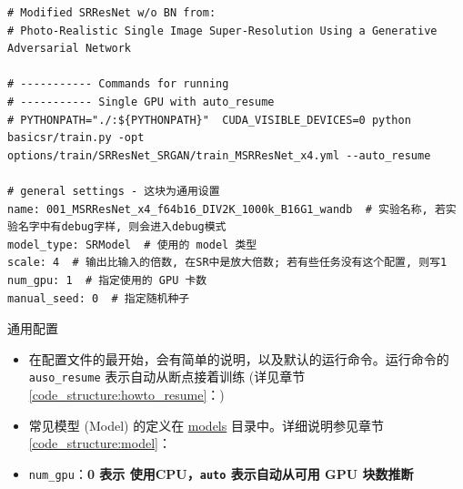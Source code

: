 \documentclass[../main.tex]{subfiles}
\begin{document}
\begin{verbatim}
# Modified SRResNet w/o BN from:
# Photo-Realistic Single Image Super-Resolution Using a Generative Adversarial Network

# ----------- Commands for running
# ----------- Single GPU with auto_resume
# PYTHONPATH="./:${PYTHONPATH}"  CUDA_VISIBLE_DEVICES=0 python basicsr/train.py -opt options/train/SRResNet_SRGAN/train_MSRResNet_x4.yml --auto_resume

# general settings - 这块为通用设置
name: 001_MSRResNet_x4_f64b16_DIV2K_1000k_B16G1_wandb  # 实验名称, 若实验名字中有debug字样, 则会进入debug模式
model_type: SRModel  # 使用的 model 类型
scale: 4  # 输出比输入的倍数, 在SR中是放大倍数; 若有些任务没有这个配置, 则写1
num_gpu: 1  # 指定使用的 GPU 卡数
manual_seed: 0  # 指定随机种子
\end{verbatim}

\begin{exampleBox}[righthand ratio=0.00, sidebyside, sidebyside align=center, lower separated=false]{通用配置}
    \begin{itemize}
        \item 在配置文件的最开始，会有简单的说明，以及默认的运行命令。运行命令的 \texttt{auso\_resume} 表示自动从断点接着训练 (详见章节\ref{code_structure:howto_resume}：)
        \item 常见模型 (Model) 的定义在 \href{https://github.com/XPixelGroup/BasicSR/tree/master/basicsr/models}{models} 目录中。详细说明参见章节\ref{code_structure:model}：
        \item \texttt{num\_gpu}：\textbf{0 表示 使用CPU，\texttt{auto} 表示自动从可用 GPU 块数推断}
    \end{itemize}
\end{exampleBox}
\end{document}
